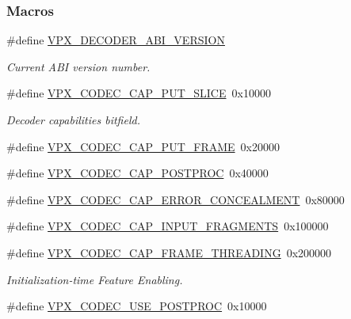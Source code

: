 \subsubsection*{Macros}
\begin{DoxyCompactItemize}
\item 
\hypertarget{group__decoder_ga462b459e7ae13937e1eae1776245db12}{\#define \hyperlink{group__decoder_ga462b459e7ae13937e1eae1776245db12}{V\+P\+X\+\_\+\+D\+E\+C\+O\+D\+E\+R\+\_\+\+A\+B\+I\+\_\+\+V\+E\+R\+S\+I\+O\+N}}\label{group__decoder_ga462b459e7ae13937e1eae1776245db12}

\begin{DoxyCompactList}\small\item\em Current A\+B\+I version number. \end{DoxyCompactList}\item 
\#define \hyperlink{group__decoder_ga9e33b8ee81025d5fc3d01b0975ad5f96}{V\+P\+X\+\_\+\+C\+O\+D\+E\+C\+\_\+\+C\+A\+P\+\_\+\+P\+U\+T\+\_\+\+S\+L\+I\+C\+E}~0x10000
\begin{DoxyCompactList}\small\item\em Decoder capabilities bitfield. \end{DoxyCompactList}\item 
\#define \hyperlink{group__decoder_ga0ef59ca8067ac1dc8c8378042277ccc8}{V\+P\+X\+\_\+\+C\+O\+D\+E\+C\+\_\+\+C\+A\+P\+\_\+\+P\+U\+T\+\_\+\+F\+R\+A\+M\+E}~0x20000
\item 
\#define \hyperlink{group__decoder_ga7825ade982ab85a5583d3d8a669baa3b}{V\+P\+X\+\_\+\+C\+O\+D\+E\+C\+\_\+\+C\+A\+P\+\_\+\+P\+O\+S\+T\+P\+R\+O\+C}~0x40000
\item 
\#define \hyperlink{group__decoder_gac44cd9e4722e1eb32a37c3eaec8d97b9}{V\+P\+X\+\_\+\+C\+O\+D\+E\+C\+\_\+\+C\+A\+P\+\_\+\+E\+R\+R\+O\+R\+\_\+\+C\+O\+N\+C\+E\+A\+L\+M\+E\+N\+T}~0x80000
\item 
\#define \hyperlink{group__decoder_gae89cbd3e8089803c6f4a67fc67a8c531}{V\+P\+X\+\_\+\+C\+O\+D\+E\+C\+\_\+\+C\+A\+P\+\_\+\+I\+N\+P\+U\+T\+\_\+\+F\+R\+A\+G\+M\+E\+N\+T\+S}~0x100000
\item 
\#define \hyperlink{group__decoder_gaee3981006b67dfdccad895cbef7936e6}{V\+P\+X\+\_\+\+C\+O\+D\+E\+C\+\_\+\+C\+A\+P\+\_\+\+F\+R\+A\+M\+E\+\_\+\+T\+H\+R\+E\+A\+D\+I\+N\+G}~0x200000
\begin{DoxyCompactList}\small\item\em Initialization-\/time Feature Enabling. \end{DoxyCompactList}\item 
\#define \hyperlink{group__decoder_ga6fe14f30254aff769412b128b29664cc}{V\+P\+X\+\_\+\+C\+O\+D\+E\+C\+\_\+\+U\+S\+E\+\_\+\+P\+O\+S\+T\+P\+R\+O\+C}~0x10000

\end{DoxyCompactItemize}
